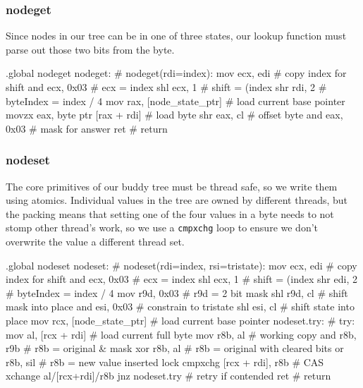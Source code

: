 \subsubsection{nodeget}

Since nodes in our tree can be in one of three states, our lookup function must
parse out those two bits from the byte.

\begin{asm}
.global nodeget
nodeget:			            # nodeget(rdi=index):
	mov	ecx, edi                    #   copy index for shift
	and	ecx, 0x03                   #   ecx = index %
	shl	ecx, 1                      #   shift = (index %
	shr	rdi, 2                      #   byteIndex = index / 4
	mov	rax, [node_state_ptr]       #   load current base pointer
	movzx	eax, byte ptr [rax + rdi]   #   load byte
	shr	eax, cl                     #   offset byte
	and	eax, 0x03                   #   mask for answer
	ret                                 #   return
\end{asm}

\subsubsection{nodeset}

The core primitives of our buddy tree must be thread safe, so we write them
using atomics. Individual values in the tree are owned by different threads,
but the packing means that setting one of the four values in a byte needs to
not stomp other thread's work, so we use a \lstinline|cmpxchg| loop to ensure
we don't overwrite the value a different thread set.

\begin{asm}
.global nodeset
nodeset:                                    # nodeset(rdi=index, rsi=tristate):
	mov	ecx, edi                    #   copy index for shift
	and	ecx, 0x03                   #   ecx = index %
	shl	ecx, 1                      #   shift = (index %
	shr	edi, 2                      #   byteIndex = index / 4
	mov	r9d, 0x03                   #   r9d = 2 bit mask
	shl	r9d, cl                     #   shift mask into place
	and	esi, 0x03                   #   constrain to tristate
	shl	esi, cl                     #   shift state into place
	mov	rcx, [node_state_ptr]       #   load current base pointer
nodeset.try:                                # try:
	mov	al, [rcx + rdi]             #   load current full byte
	mov	r8b, al                     #   working copy
	and	r8b, r9b                    #   r8b = original & mask
	xor	r8b, al                     #   r8b = original with cleared bits
	or	r8b, sil                    #   r8b = new value inserted
	lock cmpxchg [rcx + rdi], r8b       #   CAS xchange al/[rcx+rdi]/r8b
	jnz	nodeset.try                 #   retry if contended
	ret                                 #   return
\end{asm}

